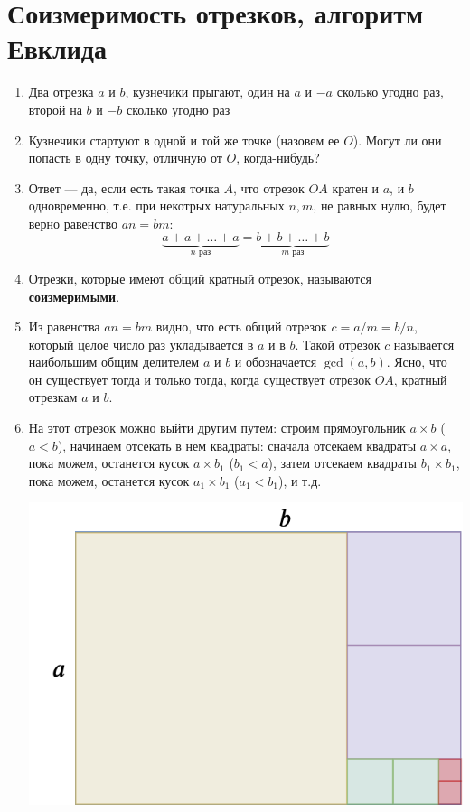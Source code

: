 \section{Соизмеримость отрезков, алгоритм Евклида}



\begin{enumerate}
\item Два отрезка $a$ и $b$, кузнечики прыгают, один на $a$ и $-a$ сколько угодно раз, второй на $b$ и $-b$ сколько угодно раз
\item Кузнечики стартуют в одной и той же точке (назовем ее $O$). Могут ли они попасть в одну точку, отличную от $O$, когда-нибудь?
\item Ответ --- да, если есть такая точка $A$, что отрезок $OA$ кратен и $a$, и $b$ одновременно, т.е. при некотрых натуральных $n,m$, не равных нулю, будет верно равенство $an=bm$:
$$
\underbrace{a+a+\dots+a}_{n\mbox{ раз}}=\underbrace{b+b+\dots+b}_{m\mbox{ раз}}
$$
\item Отрезки, которые имеют общий кратный отрезок, называются \textbf{соизмеримыми}.
\item Из равенства $an=bm$ видно, что есть общий отрезок $c=a/m=b/n$, который целое число раз укладывается в $a$ и в $b$. Такой отрезок $c$ называется наибольшим общим делителем $a$ и $b$ и обозначается $\gcd(a,b)$. Ясно, что он существует тогда и только тогда, когда существует отрезок $OA$, кратный отрезкам $a$ и $b$.
\item На этот отрезок можно выйти другим путем: строим прямоугольник $a\times b$ ($a<b$), начинаем отсекать в нем квадраты: сначала отсекаем квадраты $a\times a$, пока можем, останется кусок $a\times b_1$ ($b_1<a$), затем отсекаем квадраты $b_1\times b_1$, пока можем, останется кусок $a_1\times b_1$ ($a_1<b_1$), и т.д.
\begin{center}
\includegraphics[scale=0.3]{soizmer.png}
\end{center}


\end{enumerate}
